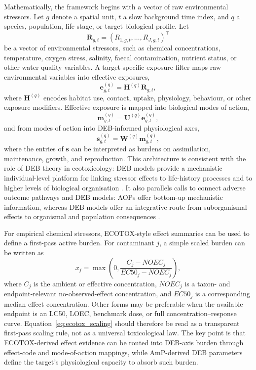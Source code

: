 	Mathematically, the framework begins with a vector of raw environmental stressors. Let $g$ denote a spatial unit, $t$ a slow background time index, and $q$ a species, population, life stage, or target biological profile. Let
	\begin{equation}
		\mathbf{R}_{g,t} = (R_{1,g,t},\ldots,R_{J,g,t})^\top
	\end{equation}
	be a vector of environmental stressors, such as chemical concentrations, temperature, oxygen stress, salinity, faecal contamination, nutrient status, or other water-quality variables. A target-specific exposure filter maps raw environmental variables into effective exposures,
	\begin{equation}
		\mathbf{e}^{(q)}_{g,t} = \mathbf{H}^{(q)}\mathbf{R}_{g,t},
	\end{equation}
	where $\mathbf{H}^{(q)}$ encodes habitat use, contact, uptake, physiology, behaviour, or other exposure modifiers. Effective exposure is mapped into biological modes of action,
	\begin{equation}
		\mathbf{m}^{(q)}_{g,t} = \mathbf{U}^{(q)}\mathbf{e}^{(q)}_{g,t},
	\end{equation}
	and from modes of action into DEB-informed physiological axes,
	\begin{equation}
		\mathbf{s}^{(q)}_{g,t} = \mathbf{W}^{(q)}\mathbf{m}^{(q)}_{g,t},
	\end{equation}
	where the entries of $\mathbf{s}$ can be interpreted as burdens on assimilation, maintenance, growth, and reproduction. This architecture is consistent with the role of DEB theory in ecotoxicology: DEB models provide a mechanistic individual-level platform for linking stressor effects to life-history processes and to higher levels of biological organisation \citep{jager2014deb,romoli2024energy}. It also parallels calls to connect adverse outcome pathways and DEB models: AOPs offer bottom-up mechanistic information, whereas DEB models offer an integrative route from suborganismal effects to organismal and population consequences \citep{murphy2018aopdeb}.
	
	For empirical chemical stressors, ECOTOX-style effect summaries can be used to define a first-pass active burden. For contaminant $j$, a simple scaled burden can be written as
	\begin{equation}
		x_j = \max\left(0,\frac{C_j - NOEC_j}{EC50_j - NOEC_j}\right),
		\label{eq:ecotox_scaling}
	\end{equation}
	where $C_j$ is the ambient or effective concentration, $NOEC_j$ is a taxon- and endpoint-relevant no-observed-effect concentration, and $EC50_j$ is a corresponding median effect concentration. Other forms may be preferable when the available endpoint is an LC50, LOEC, benchmark dose, or full concentration--response curve. Equation~\eqref{eq:ecotox_scaling} should therefore be read as a transparent first-pass scaling rule, not as a universal toxicological law. The key point is that ECOTOX-derived effect evidence can be routed into DEB-axis burden through effect-code and mode-of-action mappings, while AmP-derived DEB parameters define the target's physiological capacity to absorb such burden.
	
